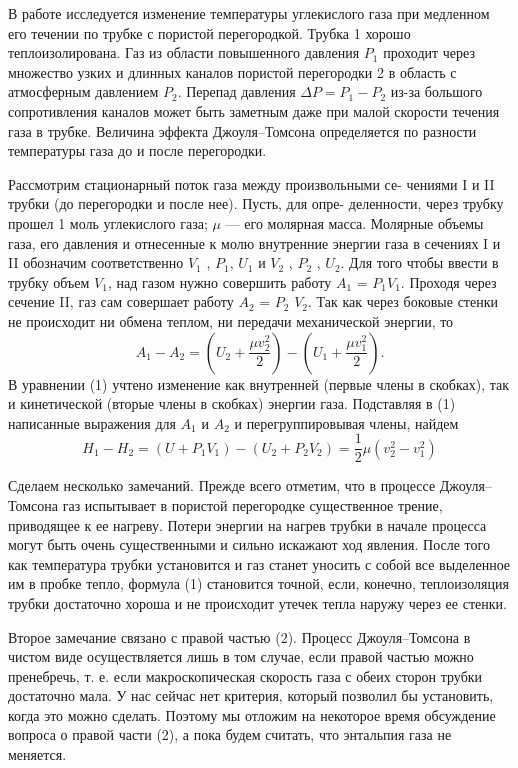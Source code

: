 \documentclass[a4paper, fontsize=14pt]{article}
\begin{document}
В работе исследуется изменение температуры углекислого газа при медленном его течении по трубке с пористой перегородкой. Трубка 1 хорошо теплоизолирована. Газ из области повышенного давления $P_1$ проходит через множество узких и длинных каналов пористой перегородки 2 в область с атмосферным давлением $P_2$. Перепад давления  $\Delta P = P_1 - P_2$ из-за большого сопротивления
каналов может быть заметным даже при малой скорости течения газа в трубке. Величина эффекта Джоуля–Томсона определяется по разности температуры газа до и после перегородки.

Рассмотрим стационарный поток газа между произвольными се-
чениями I и II трубки (до перегородки и после нее). Пусть, для опре-
деленности, через трубку прошел 1 моль углекислого газа; $\mu$ — его
молярная масса. Молярные объемы газа, его давления и отнесенные
к молю внутренние энергии газа в сечениях I и II обозначим соответственно $V_1$ , $P_1$, $U_1$ и $V_2$ , $P_2$ , $U_2$. Для того чтобы ввести в трубку объем $V_1$, над газом нужно совершить работу $A_1$ = $P_1 V_1$. Проходя через сечение II, газ сам совершает работу $A_2$ = $P_2$ $V_2$. Так как через боковые стенки не происходит ни обмена теплом, ни передачи механической
энергии, то
	\begin{equation}
		A_1-A_2 = \left(U_2+\frac{\mu v_2^2}{2}\right)-\left(U_1+\frac{\mu v_1^2}{2}\right).
	\end{equation}
В уравнении (1) учтено изменение как внутренней (первые члены в
скобках), так и кинетической (вторые члены в скобках) энергии газа.
Подставляя в (1) написанные выражения для $A_1$ и $A_2$ и перегруппировывая члены, найдем
	\begin{equation}
		H_1-H_2 = \left(U + P_1 V_1 \right) - \left(U_2 + P_2 V_2 \right) = \frac{1}{2}\mu\left(v_2^2-v_1^2\right)
	\end{equation}

	Сделаем несколько замечаний. Прежде всего отметим, что в процессе Джоуля–Томсона газ испытывает в пористой перегородке существенное трение, приводящее к ее нагреву. Потери энергии на нагрев трубки в начале процесса могут быть очень существенными и сильно искажают ход явления. После того как температура трубки установится и газ станет уносить с собой все выделенное им в пробке тепло, формула (1) становится точной, если, конечно, теплоизоляция трубки достаточно хороша и не происходит утечек тепла наружу через ее стенки.
	
	Второе замечание связано с правой частью (2). Процесс Джоуля–Томсона в чистом виде осуществляется лишь в том случае, если правой частью можно пренебречь, т. е. если макроскопическая скорость газа с обеих сторон трубки достаточно мала. У нас сейчас нет критерия, который позволил бы установить, когда это можно сделать. Поэтому мы отложим на некоторое время обсуждение вопроса о правой части (2), а пока будем считать, что энтальпия газа не меняется.
	
\end{document}
